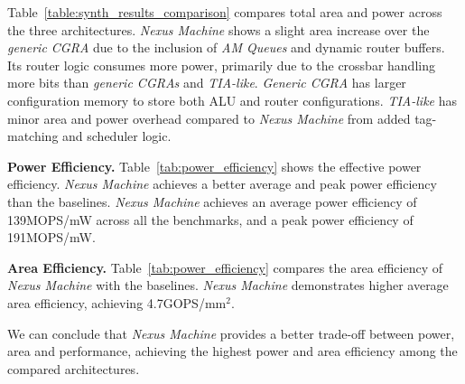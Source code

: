 Table~\ref{table:synth_results_comparison} compares total area and power across the three architectures.
\textit{Nexus Machine} shows a slight area increase over the \textit{generic CGRA} due to the inclusion of \textit{AM Queues} and dynamic router buffers.
Its router logic consumes more power, primarily due to the crossbar handling more bits than \textit{generic CGRAs} and \textit{TIA-like}.
\textit{Generic CGRA} has larger configuration memory to store both ALU and router configurations.
\textit{TIA-like} has minor area and power overhead compared to \textit{Nexus Machine} from added tag-matching and scheduler logic.
\begin{comment}
\subsubsection{Power}
The power consumption is obtained from synthesis, as mentioned above. The power distribution of all the architectures is outlined in Table~\ref{table:synth_results}.
\iffalse Notably, the AM Generation logic contributes significantly to the overall power consumption of Nexus Machine due to the presence of FIFOs.\fi
\end{comment}

{\bf Power Efficiency.}
Table~\ref{tab:power_efficiency} shows the effective power efficiency. \textit{Nexus Machine} achieves a better average and peak power efficiency than the baselines.
\textit{Nexus Machine} achieves an average power efficiency of 139MOPS/mW across all the benchmarks, and a peak power efficiency of 191MOPS/mW.

{\bf Area Efficiency.}
Table~\ref{tab:power_efficiency} compares the area efficiency of \textit{Nexus Machine} with the baselines. 
\textit{Nexus Machine} demonstrates higher average area efficiency, achieving 4.7GOPS/mm$^2$.

We can conclude that \textit{Nexus Machine} provides a better trade-off between power, area and performance, achieving the highest power and area efficiency among the compared architectures.

